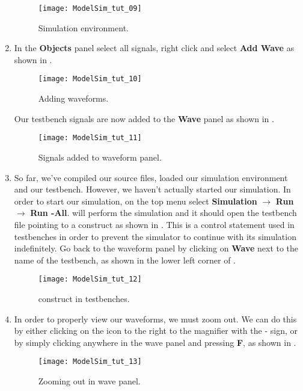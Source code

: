 \documentclass[number=01]{assignment}
\begin{document}
\begin{enumerate}
\begin{figure}[!htb]
\centering
\texttt{[image: ModelSim\_tut\_09]}
\caption{Simulation environment.}
\label{Figure:Sim_env}
\end{figure}
%
%
\newpage
\item In the \textbf{Objects} panel select all signals, right click and select \textbf{Add Wave} as shown in .
%
%
\begin{figure}[!htb]
\centering
\texttt{[image: ModelSim\_tut\_10]}
\caption{Adding waveforms.}
\label{Figure:Adding_waves}
\end{figure}
%
%
\newpage
Our testbench signals are now added to the \textbf{Wave} panel as shown in .
%
%
\begin{figure}[!htb]
\centering
\texttt{[image: ModelSim\_tut\_11]}
\caption{Signals added to waveform panel.}
\label{Figure:Signals_wave}
\end{figure}
%
%
\item So far, we've compiled our source files, loaded our simulation environment and our testbench. 
However, we haven't actually started our simulation.
In order to start our simulation, on the top menu select \textbf{Simulation} $\rightarrow$ \textbf{Run} $\rightarrow$ \textbf{Run -All}. 
\ModelSim will perform the simulation and it should open the testbench file pointing to a  construct as shown in . 
This is a control statement used in testbenches in order to prevent the simulator to continue with its simulation indefinitely. 
Go back to the waveform panel by clicking on \textbf{Wave} next to the name of the testbench, as shown in the lower left corner of .
%
%
\begin{figure}[!htb]
\centering
\texttt{[image: ModelSim\_tut\_12]}
\caption{ construct in testbenches.}
\label{Figure:Testbench_stop}
\end{figure}
\newpage
\item In order to properly view our waveforms, we must zoom out. We can do this by either clicking on the icon to the right to the magnifier with the - sign, or by simply clicking anywhere in the wave panel and pressing \textbf{F}, as shown in .
%
%
\begin{figure}[!htb]
\centering
\texttt{[image: ModelSim\_tut\_13]}
\caption{Zooming out in wave panel.}
\label{Figure:Zoom_wave}
\end{figure}


\end{enumerate}
\end{document}
